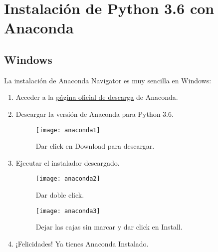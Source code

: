 \documentclass{article}
\begin{document}
    \tableofcontents
    \newpage

    \section{Instalaci\'{o}n de Python 3.6 con Anaconda}
        \subsection{Windows}
            La instalaci\'{o}n de Anaconda Navigator es muy sencilla en Windows:
            \begin{enumerate}
                \item Acceder a la \href{https://www.anaconda.com/download/}{p\'{a}gina oficial de descarga} de 
                    Anaconda.
                \item Descargar la versi\'{o}n de Anaconda para Python 3.6.
                \begin{figure}[H]
                    \centering
                    \texttt{[image: anaconda1]}
                    \caption{Dar click en Download para descargar.}
                \end{figure}

                \item Ejecutar el instalador descargado.
                \begin{figure}[H]
                    \centering
                    \texttt{[image: anaconda2]}
                    \caption{Dar doble click.}
                \end{figure}

                \begin{figure}[H]
                    \centering
                    \texttt{[image: anaconda3]}
                    \caption{Dejar las cajas sin marcar y dar click en Install.}
                \end{figure}

                \item ¡Felicidades! Ya tienes Anaconda Instalado.
            \end{enumerate}

            \newpage
\end{document}
